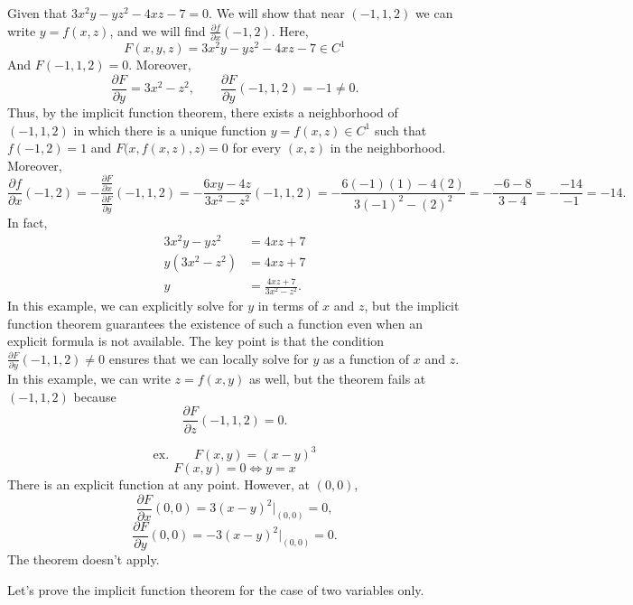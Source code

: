 \begin{example}
Given that $3x^2y - yz^2 - 4xz - 7 = 0$. We will show that near \((-1,1,2)\) we can write
$y = f(x,z)$, and we will find $\frac{\partial f}{\partial x}(-1,2)$.
Here,
\[
F(x,y,z) = 3x^2y - yz^2 - 4xz - 7 \in C^1
\]
And $F(-1,1,2) = 0$. Moreover,
\[
\frac{\partial F}{\partial y} = 3x^2 - z^2,
\qquad
\frac{\partial F}{\partial y}(-1,1,2) = -1 \ne 0.
\]
Thus, by the implicit function theorem, there exists a neighborhood of \((-1,1,2)\) in which there is a unique function \(y=f(x,z)\in C^1\) such
that \(f(-1,2)=1\) and \(F\bigl(x,f(x,z),z\bigr)=0\) for every \((x,z)\) in the neighborhood. Moreover,
\[
\frac{\partial f}{\partial x}(-1,2) = -\frac{\frac{\partial F}{\partial x}}{\frac{\partial F}{\partial y}}(-1,1,2) = -\frac{6xy - 4z}{3x^2 - z^2}(-1,1,2) = -\frac{6(-1)(1) - 4(2)}{3(-1)^2 - (2)^2} = -\frac{-6 - 8}{3 - 4} = -\frac{-14}{-1} = -14.
\]
In fact, 
\begin{align*}
    3x^2y-yz^2&= 4xz+7\\
    y(3x^2-z^2) &= 4xz+7\\
    y&=\frac{4xz+7}{3x^2-z^2}.
\end{align*}
In this example, we can explicitly solve for \(y\) in terms of \(x\) and \(z\), but the implicit function theorem guarantees the existence of such a function even when an explicit formula is not available. The key point is that the condition \(\frac{\partial F}{\partial y}(-1,1,2) \neq 0\) ensures that we can locally solve for \(y\) as a function of \(x\) and \(z\).
In this example, we can write $z=f(x,y)$ as well, but the theorem fails at \((-1,1,2)\) because
\[\frac{\partial F}{\partial z}(-1,1,2) = 0.\]
\end{example}
\begin{example}
\[
\text{ex.}\qquad F(x,y)=(x-y)^3
\]
\[
F(x,y)=0 \iff y=x
\]
There is an explicit function at any point.
However, at \((0,0)\),
\[
\frac{\partial F}{\partial x}(0,0)=3(x-y)^2\big|_{(0,0)}=0,
\]
\[
\frac{\partial F}{\partial y}(0,0)=-3(x-y)^2\big|_{(0,0)}=0.
\]
The theorem doesn't apply.
\end{example}
Let's prove the implicit function theorem for the case of two variables only.  
